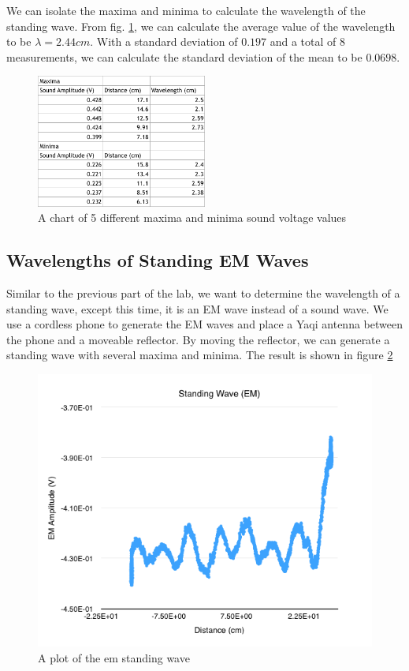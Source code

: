 \documentclass{article}
\begin{document}
We can isolate the maxima and minima to calculate the wavelength of the standing
wave. From fig. \ref{sound_wavelength}, we can calculate the average value of
the wavelength to be $\lambda = 2.44cm$. With a standard deviation of $0.197$
and a total of $8$ measurements, we can calculate the standard deviation of the
mean to be $0.0698$.

\begin{figure}[H]
    \centering
    \includegraphics[width=0.5\textwidth]{charts/sound_wavelength}
    \caption{A chart of 5 different maxima and minima sound voltage values}
    \label{sound_wavelength}
\end{figure}

\subsection{Wavelengths of Standing EM Waves}

Similar to the previous part of the lab, we want to determine the wavelength of
a standing wave, except this time, it is an EM wave instead of a sound wave. We
use a cordless phone to generate the EM waves and place a Yaqi antenna between
the phone and a moveable reflector. By moving the reflector, we can generate a
standing wave with several maxima and minima. The result is shown in figure
\ref{standingwave_em}

\begin{figure}[H]
    \centering
    \includegraphics[width=\textwidth]{charts/standingwave_em}
    \caption{A plot of the em standing wave}
    \label{standingwave_em}
\end{figure}
\end{document}
